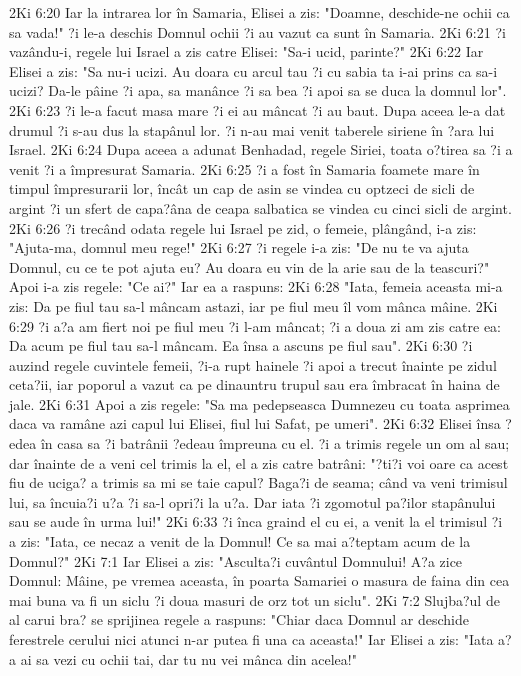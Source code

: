2Ki 6:20  Iar la intrarea lor în Samaria, Elisei a zis: "Doamne, deschide-ne ochii ca sa vada!" ?i le-a deschis Domnul ochii ?i au vazut ca sunt în Samaria.
2Ki 6:21  ?i vazându-i, regele lui Israel a zis catre Elisei: "Sa-i ucid, parinte?"
2Ki 6:22  Iar Elisei a zis: "Sa nu-i ucizi. Au doara cu arcul tau ?i cu sabia ta i-ai prins ca sa-i ucizi? Da-le pâine ?i apa, sa manânce ?i sa bea ?i apoi sa se duca la domnul lor".
2Ki 6:23  ?i le-a facut masa mare ?i ei au mâncat ?i au baut. Dupa aceea le-a dat drumul ?i s-au dus la stapânul lor. ?i n-au mai venit taberele siriene în ?ara lui Israel.
2Ki 6:24  Dupa aceea a adunat Benhadad, regele Siriei, toata o?tirea sa ?i a venit ?i a împresurat Samaria.
2Ki 6:25  ?i a fost în Samaria foamete mare în timpul împresurarii lor, încât un cap de asin se vindea cu optzeci de sicli de argint ?i un sfert de capa?âna de ceapa salbatica se vindea cu cinci sicli de argint.
2Ki 6:26  ?i trecând odata regele lui Israel pe zid, o femeie, plângând, i-a zis: "Ajuta-ma, domnul meu rege!"
2Ki 6:27  ?i regele i-a zis: "De nu te va ajuta Domnul, cu ce te pot ajuta eu? Au doara eu vin de la arie sau de la teascuri?" Apoi i-a zis regele: "Ce ai?" Iar ea a raspuns:
2Ki 6:28  "Iata, femeia aceasta mi-a zis: Da pe fiul tau sa-l mâncam astazi, iar pe fiul meu îl vom mânca mâine.
2Ki 6:29  ?i a?a am fiert noi pe fiul meu ?i l-am mâncat; ?i a doua zi am zis catre ea: Da acum pe fiul tau sa-l mâncam. Ea însa a ascuns pe fiul sau".
2Ki 6:30  ?i auzind regele cuvintele femeii, ?i-a rupt hainele ?i apoi a trecut înainte pe zidul ceta?ii, iar poporul a vazut ca pe dinauntru trupul sau era îmbracat în haina de jale.
2Ki 6:31  Apoi a zis regele: "Sa ma pedepseasca Dumnezeu cu toata asprimea daca va ramâne azi capul lui Elisei, fiul lui Safat, pe umeri".
2Ki 6:32  Elisei însa ?edea în casa sa ?i batrânii ?edeau împreuna cu el. ?i a trimis regele un om al sau; dar înainte de a veni cel trimis la el, el a zis catre batrâni: "?ti?i voi oare ca acest fiu de uciga? a trimis sa mi se taie capul? Baga?i de seama; când va veni trimisul lui, sa încuia?i u?a ?i sa-l opri?i la u?a. Dar iata ?i zgomotul pa?ilor stapânului sau se aude în urma lui!"
2Ki 6:33  ?i înca graind el cu ei, a venit la el trimisul ?i a zis: "Iata, ce necaz a venit de la Domnul! Ce sa mai a?teptam acum de la Domnul?"
2Ki 7:1  Iar Elisei a zis: "Asculta?i cuvântul Domnului! A?a zice Domnul: Mâine, pe vremea aceasta, în poarta Samariei o masura de faina din cea mai buna va fi un siclu ?i doua masuri de orz tot un siclu".
2Ki 7:2  Slujba?ul de al carui bra? se sprijinea regele a raspuns: "Chiar daca Domnul ar deschide ferestrele cerului nici atunci n-ar putea fi una ca aceasta!" Iar Elisei a zis: "Iata a?a ai sa vezi cu ochii tai, dar tu nu vei mânca din acelea!"
